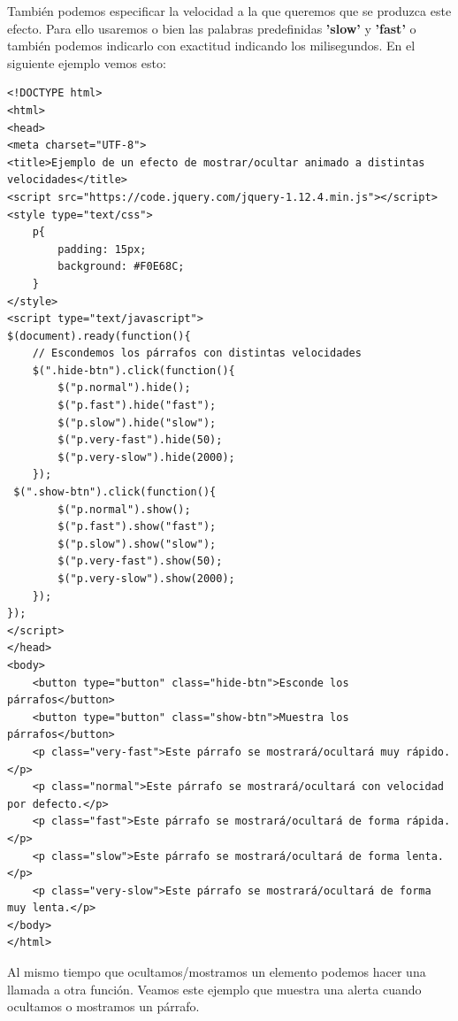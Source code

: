 \documentclass[a4paper, oneside]{article}
\begin{document}
También podemos especificar la velocidad a la que queremos que se produzca este efecto. Para ello usaremos o bien las palabras predefinidas \textbf{'slow'} y \textbf{'fast'} o también podemos indicarlo con exactitud indicando los milisegundos. En el siguiente ejemplo vemos esto:

\begin{verbatim}
<!DOCTYPE html>
<html>
<head>
<meta charset="UTF-8">
<title>Ejemplo de un efecto de mostrar/ocultar animado a distintas velocidades</title>
<script src="https://code.jquery.com/jquery-1.12.4.min.js"></script>
<style type="text/css">
    p{
        padding: 15px;
        background: #F0E68C;
    }
</style>
<script type="text/javascript">
$(document).ready(function(){
    // Escondemos los párrafos con distintas velocidades
    $(".hide-btn").click(function(){
        $("p.normal").hide();
        $("p.fast").hide("fast");
        $("p.slow").hide("slow");
        $("p.very-fast").hide(50);
        $("p.very-slow").hide(2000);
    });
 $(".show-btn").click(function(){
        $("p.normal").show();
        $("p.fast").show("fast");
        $("p.slow").show("slow");
        $("p.very-fast").show(50);
        $("p.very-slow").show(2000);
    });
});
</script>
</head>
<body>
    <button type="button" class="hide-btn">Esconde los párrafos</button> 
    <button type="button" class="show-btn">Muestra los párrafos</button>
    <p class="very-fast">Este párrafo se mostrará/ocultará muy rápido.</p>
    <p class="normal">Este párrafo se mostrará/ocultará con velocidad por defecto.</p>
    <p class="fast">Este párrafo se mostrará/ocultará de forma rápida.</p>
    <p class="slow">Este párrafo se mostrará/ocultará de forma lenta.</p>
    <p class="very-slow">Este párrafo se mostrará/ocultará de forma muy lenta.</p>
</body>
</html>                                		

\end{verbatim}

Al mismo tiempo que ocultamos/mostramos un elemento podemos hacer una llamada a otra función. Veamos este ejemplo que muestra una alerta cuando ocultamos o mostramos un párrafo.
\end{document}
